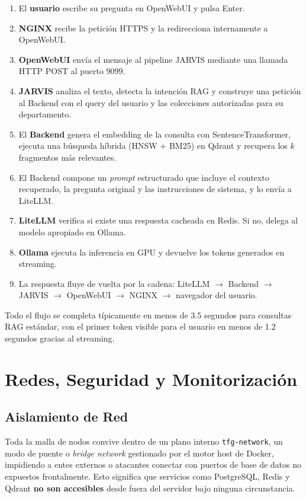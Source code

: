\begin{enumerate}
    \item El \textbf{usuario} escribe su pregunta en OpenWebUI y pulsa Enter.
    \item \textbf{NGINX} recibe la petición HTTPS y la redirecciona internamente a OpenWebUI.
    \item \textbf{OpenWebUI} envía el mensaje al pipeline JARVIS mediante una llamada HTTP POST al puerto 9099.
    \item \textbf{JARVIS} analiza el texto, detecta la intención RAG y construye una petición al Backend con el query del usuario y las colecciones autorizadas para su departamento.
    \item El \textbf{Backend} genera el embedding de la consulta con SentenceTransformer, ejecuta una búsqueda híbrida (HNSW + BM25) en Qdrant y recupera los $k$ fragmentos más relevantes.
    \item El Backend compone un \textit{prompt} estructurado que incluye el contexto recuperado, la pregunta original y las instrucciones de sistema, y lo envía a LiteLLM.
    \item \textbf{LiteLLM} verifica si existe una respuesta cacheada en Redis. Si no, delega al modelo apropiado en Ollama.
    \item \textbf{Ollama} ejecuta la inferencia en GPU y devuelve los tokens generados en streaming.
    \item La respuesta fluye de vuelta por la cadena: LiteLLM $\rightarrow$ Backend $\rightarrow$ JARVIS $\rightarrow$ OpenWebUI $\rightarrow$ NGINX $\rightarrow$ navegador del usuario.
\end{enumerate}

Todo el flujo se completa típicamente en menos de 3.5 segundos para consultas RAG estándar, con el primer token visible para el usuario en menos de 1.2 segundos gracias al streaming.

\section{Redes, Seguridad y Monitorización}

\subsection{Aislamiento de Red}
Toda la malla de nodos convive dentro de un plano interno \texttt{tfg-network}, un modo de puente o \textit{bridge network} gestionado por el motor host de Docker, impidiendo a entes externos o atacantes conectar con puertos de base de datos no expuestos frontalmente. Esto significa que servicios como PostgreSQL, Redis y Qdrant \textbf{no son accesibles} desde fuera del servidor bajo ninguna circunstancia.

